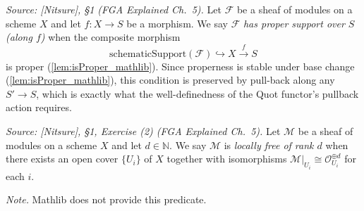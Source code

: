 \begin{definition}\leanok
  \label{def:has_proper_support}
  \textit{Source: [Nitsure], \S 1 (FGA Explained Ch.~5).}
  Let \(\mathcal{F}\) be a sheaf of modules on a scheme \(X\) and let
  \(f : X \to S\) be a morphism. We say \(\mathcal{F}\) \emph{has proper support
  over \(S\) (along \(f\))} when the composite morphism
  \[
    \mathrm{schematicSupport}(\mathcal{F}) \hookrightarrow X \xrightarrow{f} S
  \]
  is proper (\cref{lem:isProper_mathlib}). Since properness is stable under base
  change (\cref{lem:isProper_mathlib}), this condition is preserved by pull-back
  along any \(S'\to S\), which is exactly what the well-definedness of the Quot
  functor's pullback action requires.
\end{definition}

\begin{definition}\leanok
  \label{def:is_locally_free_of_rank}
  \textit{Source: [Nitsure], \S 1, Exercise (2) (FGA Explained Ch.~5).}
  Let \(\mathcal{M}\) be a sheaf of modules on a scheme \(X\) and let
  \(d \in \mathbb{N}\). We say \(\mathcal{M}\) is \emph{locally free of rank
  \(d\)} when there exists an open cover \(\{U_i\}\) of \(X\) together with
  isomorphisms \(\mathcal{M}|_{U_i} \cong \mathcal{O}_{U_i}^{\oplus d}\) for
  each \(i\).

  \emph{Note.} Mathlib does not provide this predicate.
\end{definition}

